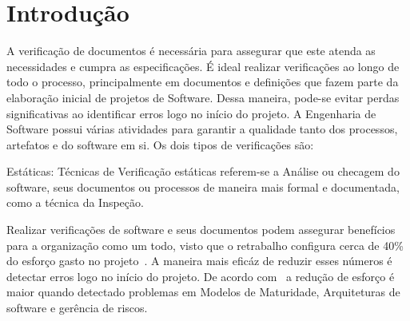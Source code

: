 \chapter{Introdução}

A verificação de documentos é necessária para assegurar que este atenda as necessidades e cumpra as especificações. É ideal realizar verificações ao longo de todo o processo, principalmente em documentos e definições que fazem parte da elaboração inicial de projetos de Software. Dessa maneira, pode-se evitar perdas significativas ao identificar erros logo no início do projeto.
A Engenharia de Software possui várias atividades para garantir a qualidade tanto dos processos, artefatos e do software em si. Os dois tipos de verificações são: 

Estáticas: Técnicas de Verificação estáticas referem-se a Análise ou checagem do software, seus documentos ou processos de maneira mais formal e documentada, como a técnica da Inspeção.

Realizar verificações de software e seus documentos podem assegurar benefícios para a organização como um todo, visto que o retrabalho configura cerca de 40\% do esforço gasto no projeto~\cite{}. 
A maneira mais eficáz de reduzir esses números é detectar erros logo no início do projeto. De acordo com~\cite{} a redução de esforço é maior quando detectado problemas em Modelos de Maturidade, Arquiteturas de software e gerência de riscos. 

